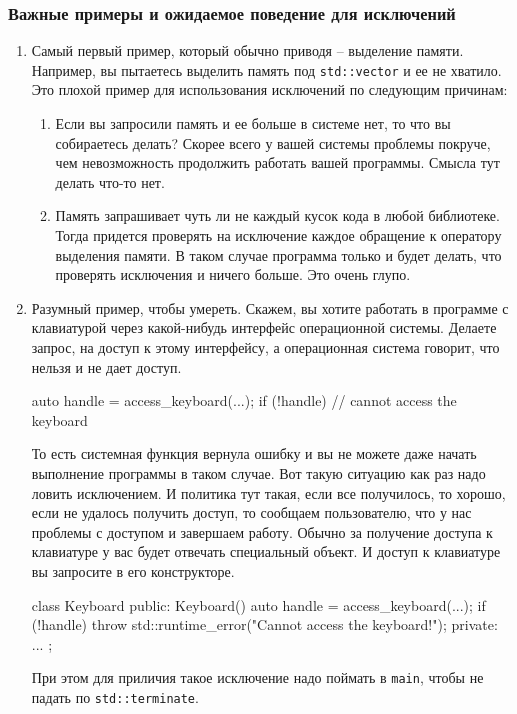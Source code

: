\subsubsection{Важные примеры и ожидаемое поведение для исключений}

\begin{enumerate}
\item Самый первый пример, который обычно приводя -- выделение памяти.
Например, вы пытаетесь выделить память под \verb"std::vector" и ее не хватило.
Это плохой пример для использования исключений по следующим причинам:
\begin{enumerate}
\item Если вы запросили память и ее больше в системе нет, то что вы собираетесь делать?
Скорее всего у вашей системы проблемы покруче, чем невозможность продолжить работать вашей программы.
Смысла тут делать что-то нет.

\item Память запрашивает чуть ли не каждый кусок кода в любой библиотеке.
Тогда придется проверять на исключение каждое обращение к оператору выделения памяти.
В таком случае программа только и будет делать, что проверять исключения и ничего больше.
Это очень глупо.
\end{enumerate}

\item
\label{item::example::ExceptionDie}
Разумный пример, чтобы умереть.
Скажем, вы хотите работать в программе с клавиатурой через какой-нибудь интерфейс операционной системы.
Делаете запрос, на доступ к этому интерфейсу, а операционная система говорит, что нельзя и не дает доступ.
\begin{cppcode}
auto handle = access_keyboard(...);
if (!handle) {
  // cannot access the keyboard
}
\end{cppcode}
То есть системная функция вернула ошибку и вы не можете даже начать выполнение программы в таком случае.
Вот такую ситуацию как раз надо ловить исключением.
И политика тут такая, если все получилось, то хорошо, если не удалось получить доступ, то сообщаем пользователю, что у нас проблемы с доступом и завершаем работу.
Обычно за получение доступа к клавиатуре у вас будет отвечать специальный объект.
И доступ к клавиатуре вы запросите в его конструкторе.
\begin{cppcode}
class Keyboard {
public:
  Keyboard() {
    auto handle = access_keyboard(...);
    if (!handle)
      throw std::runtime_error("Cannot access the keyboard!");
  }
private:
  ...
};
\end{cppcode}
При этом для приличия такое исключение надо поймать в \verb"main", чтобы не падать по \verb"std::terminate".


\end{enumerate}
